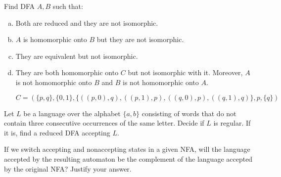 \documentclass[a4paper,12pt]{amsart}
\begin{document}
\medskip\begin{problem} 
    
    Find DFA $A,B$ such that:
    
    \medskip
    
    \begin{enumerate}[(a)]\setlength\itemsep{12pt}
        \item Both are reduced and they are not isomorphic. 
        \item $A$ is homomorphic onto $B$ but they are not isomorphic.
        \item They are equivalent but not isomorphic.
        \item They are both homomorphic onto $C$ but not isomorphic with it. Moreover, $A$ is not homomorphic onto $B$ and $B$ is not homomorphic onto $A$.

        $$
        C=(\{p,q\},\{0,1\},\{((p,0),q),((p,1),p),((q,0),p),((q,1),q)\},p,\{q\})
        $$
    \end{enumerate}

\end{problem}


\medskip\begin{problem}
    
    Let $L$ be a language over the alphabet $\{a,b\}$ consisting of words that do not contain three consecutive occurrences of the same letter. Decide if $L$ is regular. If it is, find a reduced DFA accepting $L$.

\end{problem}


\medskip\begin{problem}
    
    If we switch accepting and nonaccepting states in a given NFA, will the language accepted by the resulting automaton be the complement of the language accepted by the original NFA? Justify your answer.

\end{problem}
\end{document}
